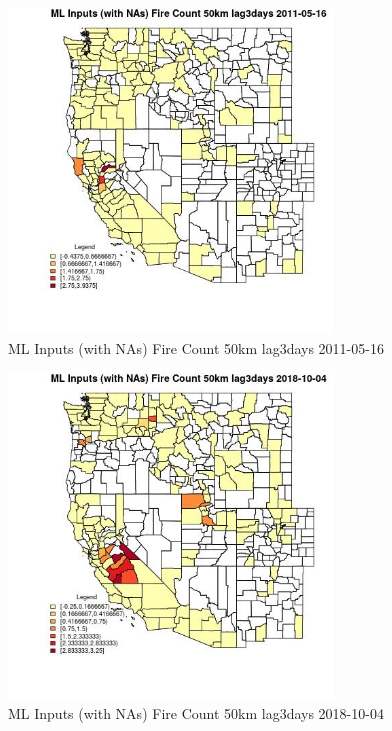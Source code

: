 \begin{figure} 
\centering  
\includegraphics[width=0.77\textwidth]{Code_Outputs/Report_ML_input_PM25_Step4_part_f_de_duplicated_aveswNAs_CountyFire_Count_50km_lag3daysMean2011-05-16.jpg} 
\caption{\label{fig:Report_ML_input_PM25_Step4_part_f_de_duplicated_aveswNAsCountyFire_Count_50km_lag3daysMean2011-05-16}ML Inputs (with NAs) Fire Count 50km lag3days 2011-05-16} 
\end{figure} 
 

\begin{figure} 
\centering  
\includegraphics[width=0.77\textwidth]{Code_Outputs/Report_ML_input_PM25_Step4_part_f_de_duplicated_aveswNAs_CountyFire_Count_50km_lag3daysMean2018-10-04.jpg} 
\caption{\label{fig:Report_ML_input_PM25_Step4_part_f_de_duplicated_aveswNAsCountyFire_Count_50km_lag3daysMean2018-10-04}ML Inputs (with NAs) Fire Count 50km lag3days 2018-10-04} 
\end{figure} 
 

